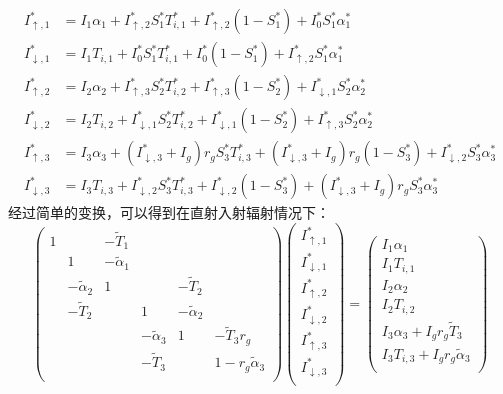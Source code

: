 \begin{equation}
\begin{aligned}
I_{\uparrow, 1}^{*} & =I_{1} \alpha_{1}+I_{\uparrow, 2}^{*} S_{1}^{*} T_{i, 1}^{*}+I_{\uparrow, 2}^{*}\left(1-S_{1}^{*}\right)+I_{0}^{*} S_{1}^{*} \alpha_{1}^{*} \\[1ex] 
I_{\downarrow, 1}^{*} &=I_{1} T_{i, 1}+I_{0}^{*} S_{1}^{*} T_{i, 1}^{*}+I_{0}^{*}\left(1-S_{1}^{*}\right)+I_{\uparrow, 2}^{*} S_{1}^{*} \alpha_{1}^{*} \\[1ex] 
I_{\uparrow, 2}^{*} &=I_{2} \alpha_{2}+I_{\uparrow, 3}^{*} S_{2}^{*} T_{i, 2}^{*}+I_{\uparrow, 3}^{*}\left(1-S_{2}^{*}\right)+I_{\downarrow, 1}^{*} S_{2}^{*} \alpha_{2}^{*} \\[1ex]
I_{\downarrow, 2}^{*} &=I_{2} T_{i, 2}+I_{\downarrow, 1}^{*} S_{2}^{*} T_{i, 2}^{*}+I_{\downarrow, 1}^{*}\left(1-S_{2}^{*}\right)+I_{\uparrow, 3}^{*} S_{2}^{*} \alpha_{2}^{*} \\[1ex]
I_{\uparrow, 3}^{*} &=I_{3} \alpha_{3}+\left(I_{\downarrow, 3}^{*}+I_{g}\right) r_{g} S_{3}^{*} T_{i, 3}^{*}+\left(I_{\downarrow, 3}^{*}+I_{g}\right) r_{g}\left(1-S_{3}^{*}\right)+I_{\downarrow, 2}^{*} S_{3}^{*} \alpha_{3}^{*} \\[1ex]
I_{\downarrow, 3}^{*} &=I_{3} T_{i, 3}+I_{\downarrow, 2}^{*} S_{3}^{*} T_{i, 3}^{*}+I_{\downarrow, 2}^{*}\left(1-S_{3}^{*}\right)+\left(I_{\downarrow, 3}^{*}+I_{g}\right) r_{g} S_{3}^{*} \alpha_{3}^{*}
\end{aligned}
\end{equation}
经过简单的变换，可以得到在直射入射辐射情况下：
\begin{equation}
\left(\begin{matrix}1&&-{\widetilde{T}}_1&&&\\&1&-{\widetilde{\alpha}}_1&&&\\&-{\widetilde{\alpha}}_2&1&&-{\widetilde{T}}_2&\\&-{\widetilde{T}}_2&&1&-{\widetilde{\alpha}}_2&\\&&&-{\widetilde{\alpha}}_3&1&-{\widetilde{T}}_3r_g\\&&&-{\widetilde{T}}_3&&1-r_g{\widetilde{\alpha}}_3\\\end{matrix}\right)\left(\begin{matrix}I_{\uparrow,1}^\ast\\I_{\downarrow,1}^\ast\\I_{\uparrow,2}^\ast\\I_{\downarrow,2}^\ast\\I_{\uparrow,3}^\ast\\I_{\downarrow,3}^\ast\\\end{matrix}\right)=\left(\begin{matrix}I_1\alpha_1\\I_1T_{i,1}\\I_2\alpha_2\\I_2T_{i,2}\\I_3\alpha_3+I_gr_g{\widetilde{T}}_3\\I_3T_{i,3}+I_gr_g{\widetilde{\alpha}}_3\\\end{matrix}\right)
\end{equation}
